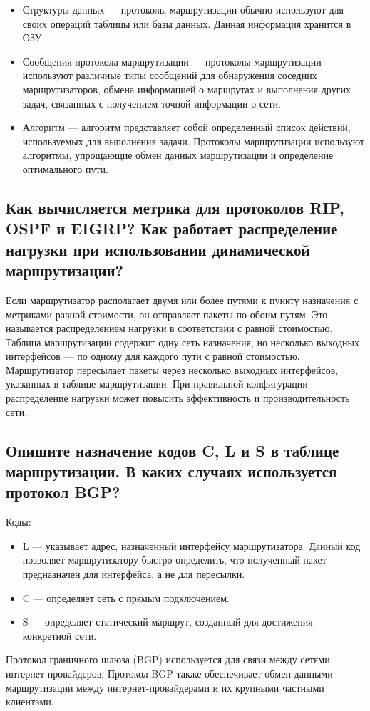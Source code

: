 \begin{itemize}
	\item Структуры данных --- протоколы маршрутизации обычно 
		используют для своих операций таблицы или базы данных. Данная 
		информация хранится в ОЗУ.
	\item Сообщения протокола маршрутизации --- протоколы 
		маршрутизации используют различные типы сообщений для 
		обнаружения соседних маршрутизаторов, обмена информацией о 
		маршрутах и выполнения других задач, связанных с получением 
		точной информации о сети.
	\item Алгоритм --- алгоритм представляет собой определенный список 
		действий, используемых для выполнения задачи. Протоколы 
		маршрутизации используют алгоритмы, упрощающие обмен данных 
		маршрутизации и определение оптимального пути.
\end{itemize}

\subsection{Как вычисляется метрика для протоколов RIP, OSPF и EIGRP? 
	Как работает распределение нагрузки при использовании 
	динамической маршрутизации?}

\begin{image}
\end{image}

Если маршрутизатор располагает двумя или более путями к пункту 
назначения с метриками равной стоимости, он отправляет пакеты по обоим 
путям. Это называется распределением нагрузки в соответствии с равной 
стоимостью. Таблица маршрутизации содержит одну сеть назначения, но 
несколько выходных интерфейсов --- по одному для каждого пути с равной 
стоимостью. Маршрутизатор пересылает пакеты через несколько выходных 
интерфейсов, указанных в таблице маршрутизации.
При правильной конфигурации распределение нагрузки может 
повысить эффективность и производительность сети.

\subsection{Опишите назначение кодов C, L и S в таблице маршрутизации. 
	В каких случаях используется протокол BGP?}

Коды:

\begin{itemize}
	\item L --- указывает адрес, назначенный интерфейсу маршрутизатора. 
		Данный код позволяет маршрутизатору быстро определить, что 
		полученный пакет предназначен для интерфейса, а не для пересылки.
	\item C --- определяет сеть с прямым подключением.
	\item S --- определяет статический маршрут, созданный для 
		достижения конкретной сети.
\end{itemize}

Протокол граничного шлюза (BGP) используется для связи между 
сетями интернет-провайдеров. Протокол BGP также обеспечивает обмен 
данными маршрутизации между интернет-провайдерами и их крупными 
частными клиентами.

